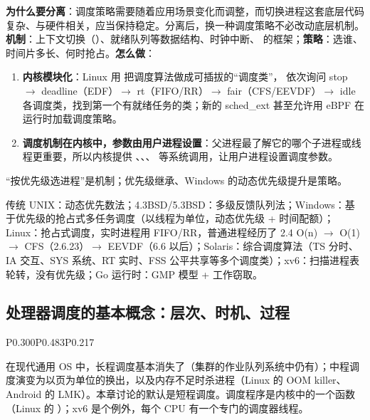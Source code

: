 \textbf{为什么要分离}：调度策略需要随着应用场景变化而调整，而切换进程这套底层代码复杂、与硬件相关，应当保持稳定。分离后，换一种调度策略不必改动底层机制。\textbf{机制}：上下文切换（）、就绪队列等数据结构、时钟中断、 的框架；\textbf{策略}：选谁、时间片多长、何时抢占。\textbf{怎么做}：
\begin{enumerate}
    \item \textbf{内核模块化}：Linux 用  把调度算法做成可插拔的“调度类”， 依次询问 stop $\to$ deadline（EDF）$\to$ rt（FIFO/RR）$\to$ fair（CFS/EEVDF）$\to$ idle 各调度类，找到第一个有就绪任务的类；新的 sched\_ext 甚至允许用 eBPF 在运行时加载调度策略。
    \item \textbf{调度机制在内核中，参数由用户进程设置}：父进程最了解它的哪个子进程或线程更重要，所以内核提供 、、、 等系统调用，让用户进程设置调度参数。
\end{enumerate}
“按优先级选进程”是机制；优先级继承、Windows 的动态优先级提升是策略。

传统 UNIX：动态优先数法；4.3BSD/5.3BSD：多级反馈队列法；Windows：基于优先级的抢占式多任务调度（以线程为单位，动态优先级 + 时间配额）；Linux：抢占式调度，实时进程用 FIFO/RR，普通进程经历了 2.4 O(n) $\to$ O(1) $\to$ CFS（2.6.23）$\to$ EEVDF（6.6 以后）；Solaris：综合调度算法（TS 分时、IA 交互、SYS 系统、RT 实时、FSS 公平共享等多个调度类）；xv6：扫描进程表轮转，没有优先级；Go 运行时：GMP 模型 + 工作窃取。

\subsection{处理器调度的基本概念：层次、时机、过程}
\begin{btab}{P{0.300}P{0.483}P{0.217}}
\end{btab}
在现代通用 OS 中，长程调度基本消失了（集群的作业队列系统中仍有）；中程调度演变为以页为单位的换出，以及内存不足时杀进程（Linux 的 OOM killer、Android 的 LMK）。本章讨论的默认是短程调度。调度程序是内核中的一个函数（Linux 的 ）；xv6 是个例外，每个 CPU 有一个专门的调度器线程。

